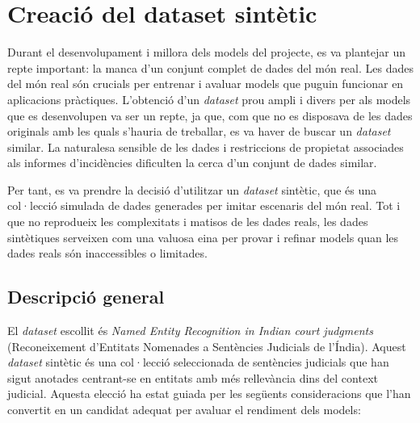 \section{Creació del dataset sintètic}

Durant el desenvolupament i millora dels models del projecte, es va plantejar un repte important: la manca d'un conjunt complet de dades del món real. Les dades del món real són crucials per entrenar i avaluar models que puguin funcionar en aplicacions pràctiques. L'obtenció d'un \textit{dataset} prou ampli i divers per als models que es desenvolupen va ser un repte, ja que, com que no es disposava de les dades originals amb les quals s'hauria de treballar, es va haver de buscar un \textit{dataset} similar. La naturalesa sensible de les dades i restriccions de propietat associades als informes d'incidències dificulten la cerca d'un conjunt de dades similar.

Per tant, es va prendre la decisió d'utilitzar un \textit{dataset} sintètic, que és una col·lecció simulada de dades generades per imitar escenaris del món real. Tot i que no reprodueix les complexitats i matisos de les dades reals, les dades sintètiques serveixen com una valuosa eina per provar i refinar models quan les dades reals són inaccessibles o limitades.


\subsection{Descripció general}
El \textit{dataset} escollit és \textit{Named Entity Recognition in Indian court judgments} \cite{dataset} (Reconeixement d'Entitats Nomenades a Sentències Judicials de l'Índia). Aquest \textit{dataset} sintètic és una col·lecció seleccionada de sentències judicials que han sigut anotades centrant-se en entitats amb més rellevància dins del context judicial. Aquesta elecció ha estat guiada per les següents consideracions que l'han convertit en un candidat adequat per avaluar el rendiment dels models:


